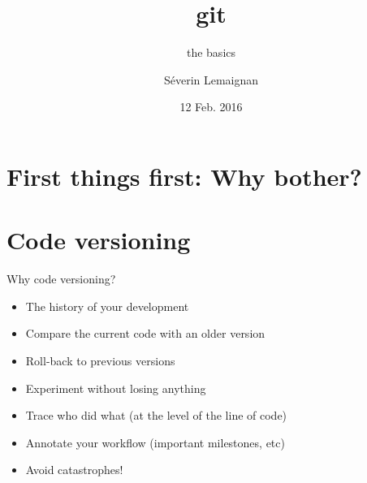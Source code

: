 \documentclass[compress]{beamer}
\title{\bf git}
\subtitle{the basics}
\date{12 Feb. 2016}
\author{Séverin Lemaignan}
\institute{Centre for Robotics \& Neural
Systems\\{\bf Plymouth University}}
\begin{document}
\maketitle


\section{First things first: Why bother?}


{
    \begin{frame}[plain]{}
    \end{frame}
}

\section{Code versioning}

\begin{frame}{Why code versioning?}

    \begin{itemize}
        \item The history of your development
        \item Compare the current code with an older version
        \item Roll-back to previous versions
        \item Experiment without losing anything
        \item Trace who did what (at the level of the line of code)
        \item Annotate your workflow (important milestones, etc)
        \item Avoid catastrophes!
    \end{itemize}
\end{frame}
\end{document}
